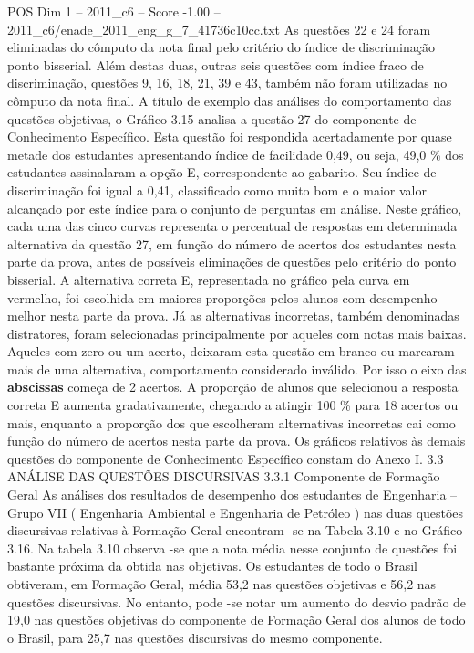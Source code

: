 \begin{textsample}{POS Dim 1 – 2011\_c6 – Score -1.00 – 2011\_c6/enade\_2011\_eng\_g\_7\_41736c10cc.txt}
As questões 22 e 24 foram eliminadas do cômputo da nota final pelo critério do índice de discriminação ponto bisserial.
Além destas duas, outras seis questões com índice fraco de discriminação, questões 9, 16, 18, 21, 39 e 43, também não foram utilizadas no cômputo da nota final.
A título de exemplo das análises do comportamento das questões objetivas, o Gráfico 3.15 analisa a questão 27 do componente de Conhecimento Específico.
Esta questão foi respondida acertadamente por quase metade dos estudantes apresentando índice de facilidade 0,49, ou seja, 49,0 \% dos estudantes assinalaram a opção E, correspondente ao gabarito.
Seu índice de discriminação foi igual a 0,41, classificado como muito bom e o maior valor alcançado por este índice para o conjunto de perguntas em análise.
Neste gráfico, cada uma das cinco curvas representa o percentual de respostas em determinada alternativa da questão 27, em função do número de acertos dos estudantes nesta parte da prova, antes de possíveis eliminações de questões pelo critério do ponto bisserial.
A alternativa correta E, representada no gráfico pela curva em vermelho, foi escolhida em maiores proporções pelos alunos com desempenho melhor nesta parte da prova.
Já as alternativas incorretas, também denominadas distratores, foram selecionadas principalmente por aqueles com notas mais baixas.
Aqueles com zero ou um acerto, deixaram esta questão em branco ou marcaram mais de uma alternativa, comportamento considerado inválido.
Por isso o eixo das \textbf{abscissas} começa de 2 acertos.
A proporção de alunos que selecionou a resposta correta E aumenta gradativamente, chegando a atingir 100 \% para 18 acertos ou mais, enquanto a proporção dos que escolheram alternativas incorretas cai como função do número de acertos nesta parte da prova.
Os gráficos relativos às demais questões do componente de Conhecimento Específico constam do Anexo I. 3.3 ANÁLISE DAS QUESTÕES DISCURSIVAS 3.3.1 Componente de Formação Geral As análises dos resultados de desempenho dos estudantes de Engenharia – Grupo VII ( Engenharia Ambiental e Engenharia de Petróleo ) nas duas questões discursivas relativas à Formação Geral encontram -se na Tabela 3.10 e no Gráfico 3.16.
Na tabela 3.10 observa -se que a nota média nesse conjunto de questões foi bastante próxima da obtida nas objetivas.
Os estudantes de todo o Brasil obtiveram, em Formação Geral, média 53,2 nas questões objetivas e 56,2 nas questões discursivas.
No entanto, pode -se notar um aumento do desvio padrão de 19,0 nas questões objetivas do componente de Formação Geral dos alunos de todo o Brasil, para 25,7 nas questões discursivas do mesmo componente.

\end{textsample}
